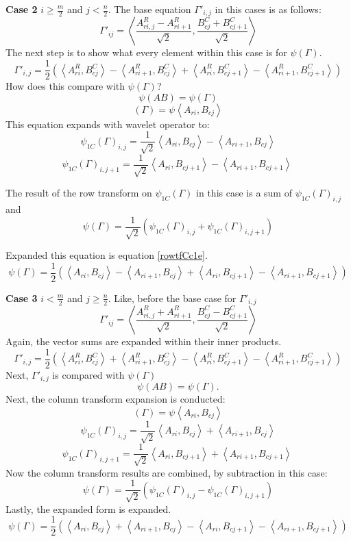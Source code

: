 \textbf{Case 2} $i \geq \frac{m}{2}$ and $j <  \frac{n}{2}$.
The base equation $\Gamma'_{i,j}$ in this cases is as follows:
\[ \Gamma'_{ij} = \left\langle \frac {A^R_{ri,j} - A^R_{ri+1}}{\sqrt{2}} , \frac {B^C_{cj} + B^C_{cj + 1}}{\sqrt{2}} \right\rangle  \]
The next step is to show what every element within this case is for $\psi(\Gamma)$.  
\[ \Gamma'_{i,j} = \frac{1}{2} ( \left\langle A^R_{ri}, B^C_{cj}   \right\rangle -   \left\langle A^R_{ri+1}, B^C_{cj}   \right\rangle +  \left\langle A^R_{ri}, B^C_{cj + 1}   \right\rangle -  \left\langle A^R_{ri+1}, B^C_{cj+1}   \right\rangle    ) \]
How does this compare with $\psi (\Gamma)$?
\[ \psi (A B)  = \psi (\Gamma)    \]
\[ (\Gamma) = \psi  \left\langle A_{ri} , B_{cj}  \right\rangle \]
This equation expands with wavelet operator to:
\[ \psi_{1C} (\Gamma)_{i,j} = \frac{1}{\sqrt{2}} \left\langle A_{ri} , B_{cj}  \right\rangle - \left\langle A_{ri +1} , B_{cj}  \right\rangle   \]
\[ \psi_{1C} (\Gamma)_{i,j+1} = \frac{1}{\sqrt{2}} \left\langle A_{ri} , B_{cj+1}  \right\rangle - \left\langle A_{ri +1} , B_{cj+1}  \right\rangle \  \]

The result of the row transform on $\psi_{1C}(\Gamma)$ in this case is a sum of $\psi_{1C}(\Gamma)_{i,j}$ and 
\[ \psi(\Gamma) = \frac{1}{\sqrt {2}} (\psi_{1C} (\Gamma)_{i,j} + \psi_{1C} (\Gamma)_{i,j+1}   ) \]

 Expanded this equation is equation \ref{rowtfCc1e}.
\[ \psi(\Gamma) = \frac{1}{2} (  \left\langle A_{ri} , B_{cj}  \right\rangle - \left\langle A_{ri +1} , B_{cj}  \right\rangle + \left\langle A_{ri} , B_{cj+1}  \right\rangle - \left\langle A_{ri +1} , B_{cj+1}  \right\rangle   ) \]

\textbf {Case 3} $i < \frac {m}{2}$ and $j \ge \frac{n}{2}$.
Like, before the base case for $\Gamma'_{i,j}$
\[ \Gamma'_{ij} = \left\langle \frac {A^R_{ri,j} + A^R_{ri+1}}{\sqrt{2}} , \frac {B^C_{cj} - B^C_{cj + 1}}{\sqrt{2}} \right\rangle  \]
Again, the vector sums are expanded within their inner products.  
\[ \Gamma'_{i,j} = \frac{1}{2} ( \left\langle A^R_{ri}, B^C_{cj}   \right\rangle +   \left\langle A^R_{ri+1}, B^C_{cj}   \right\rangle -  \left\langle A^R_{ri}, B^C_{cj + 1}   \right\rangle -  \left\langle A^R_{ri+1}, B^C_{cj+1}   \right\rangle    ) \]
Next, $\Gamma'_{i,j}$ is compared with $\psi(\Gamma)$
\[ \psi (A B)  = \psi (\Gamma)  .  \]
Next, the column transform expansion is conducted:
\[ (\Gamma) = \psi  \left\langle A_{ri} , B_{cj}  \right\rangle \]
\[ \psi_{1C} (\Gamma)_{i,j} = \frac{1}{\sqrt{2}} \left\langle A_{ri} , B_{cj}  \right\rangle + \left\langle A_{ri +1} , B_{cj}  \right\rangle   \]
\[ \psi_{1C} (\Gamma)_{i,j+1} = \frac{1}{\sqrt{2}} \left\langle A_{ri} , B_{cj+1}  \right\rangle + \left\langle A_{ri +1} , B_{cj+1}  \right\rangle \  \]
Now the column transform results are combined, by subtraction in this case:
\[ \psi(\Gamma) = \frac{1}{\sqrt {2}} (\psi_{1C} (\Gamma)_{i,j} - \psi_{1C} (\Gamma)_{i,j+1}   ) \]
Lastly, the expanded form is expanded.
\[ \psi(\Gamma) = \frac{1}{2} (  \left\langle A_{ri} , B_{cj}  \right\rangle + \left\langle A_{ri +1} , B_{cj}  \right\rangle - \left\langle A_{ri} , B_{cj+1}  \right\rangle - \left\langle A_{ri +1} , B_{cj+1}  \right\rangle   ) \]

